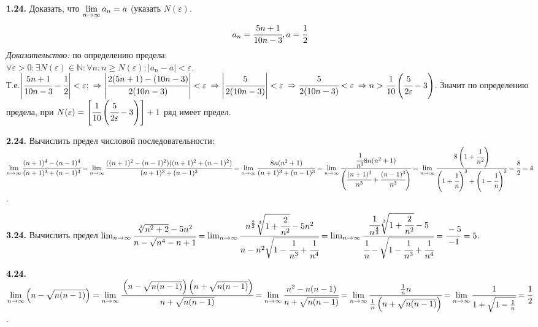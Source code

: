 


\tableofcontents


\newpage
\Chapter{\lab\labnumber}{\labtheme}{}

\textbf{1.24.} Доказать, что $\displaystyle\lim _{n\to \infty} a_n = a$ (указать $N(\varepsilon)$.
$$a_n = \cfrac{5n+1}{10n-3}, a=\cfrac 1 2$$
\textit{Доказательство:} по определению предела:\\ $\forall\varepsilon>0:\exists N(\varepsilon) \in \mathbb{N}: \forall n: n\geqslant N(\varepsilon):|a_n-a|<\varepsilon.$ \\
Т.е.$ \left|\cfrac{5n+1}{10n-3}-\cfrac 1 2\right|<\varepsilon;$
$\Rightarrow \left|\cfrac{2(5n+1)-(10n-3)}{2(10n-3)}\right|<\varepsilon$
$\Rightarrow\left|\cfrac{5}{2(10n-3)}\right|<\varepsilon$
$\Rightarrow\cfrac{5}{2(10n-3)}<\varepsilon$ $\Rightarrow n>\cfrac 1 {10} \left(\cfrac 5 {2\varepsilon} - 3 \right)$. Значит по определению предела, при $N(\varepsilon)=\left[\cfrac 1 {10} \left(\cfrac 5 {2\varepsilon} -3\right)\right]+1$ ряд имеет предел.

\textbf{2.24.} Вычислить предел числовой последовательности:\\
$\displaystyle\lim_{n\to \infty}\cfrac{(n+1)^4-(n-1)^4}{(n+1)^3+(n-1)^3}=\displaystyle\lim_{n\to \infty}\cfrac{((n+1)^2-(n-1)^2)((n+1)^2+(n-1)^2)}{(n+1)^3+(n-1)^3}=\lim_{n\to \infty}\cfrac{8n(n^2+1)}{(n+1)^3+(n-1)^3}=\displaystyle\lim_{n\to \infty}\cfrac{\cfrac 1 {n^3} 8n(n^2+1)}{\left(\cfrac{(n+1)^3}{n^3}+\cfrac{(n-1)^3}{n^3}\right)}=\displaystyle\lim_{n\to \infty}\cfrac{8\left(1+\cfrac 1 {n^2}\right)} {\left(1+\cfrac 1 n \right)^3+\left(1-\cfrac 1 {n}\right)^3}=\cfrac 8 2 = 4$.

\textbf{3.24.} Вычислить предел $\lim_{n\to \infty}\cfrac {\sqrt[3]{n^2+2}-5n^2}{n-\sqrt{n^4-n+1}}=\lim_{n\to \infty}\cfrac {n^{\frac 2 3}\sqrt[3]{1+\cfrac 2 {n^2}}-5n^2}{n-n^2\sqrt{1-\cfrac 1 {n^3}+\cfrac 1 {n^4}}}=\lim_{n\to \infty}\cfrac {\cfrac 1 {n^{\frac 4 3}}\sqrt[3]{1+\cfrac 2 {n^2}}-5}{\cfrac 1 n-\sqrt{1-\cfrac 1 {n^3}+\cfrac 1 {n^4}}}=\cfrac {-5}{-1}=5$.

\textbf{4.24.} $\displaystyle\lim_{n\to \infty}\left( n-\sqrt{n(n-1)}\right)=\displaystyle\lim_{n\to \infty}\cfrac{\left( n-\sqrt{n(n-1)}\right)\left(n+\sqrt{n(n-1)}\right)}{n+\sqrt{n(n-1)}}=\displaystyle\lim_{n\to \infty}\cfrac{ n^2-n(n-1)}{ n+\sqrt{n(n-1)}}=\displaystyle\lim_{n\to \infty}\cfrac{\frac 1 n n}{\frac 1 n \left( n+\sqrt{n(n-1)}\right)}=\displaystyle\lim_{n\to \infty}\cfrac{1}{1 +\sqrt{1-\frac 1 n}}=\cfrac 1 2$.

